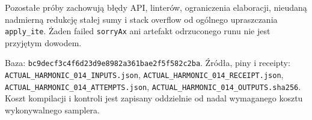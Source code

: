 \documentclass[11pt,a4paper]{article}
\newcommand{\code}[1]{\nolinkurl{#1}}
\begin{document}
Pozostałe próby zachowują błędy API, linterów, ograniczenia elaboracji,
nieudaną nadmierną redukcję stałej sumy i stack overflow od ogólnego
upraszczania \code{apply_ite}. Żaden failed \code{sorryAx} ani artefakt
odrzuconego runu nie jest przyjętym dowodem.

Baza: \code{bc9decf3c4f6d23d9e8982a361bae2f5f582c2ba}.
Źródła, piny i receipty: \code{ACTUAL_HARMONIC_014_INPUTS.json},
\code{ACTUAL_HARMONIC_014_RECEIPT.json}, \code{ACTUAL_HARMONIC_014_ATTEMPTS.json},
\code{ACTUAL_HARMONIC_014_OUTPUTS.sha256}. Koszt kompilacji i kontroli jest
zapisany oddzielnie od nadal wymaganego kosztu wykonywalnego samplera.
\end{document}
